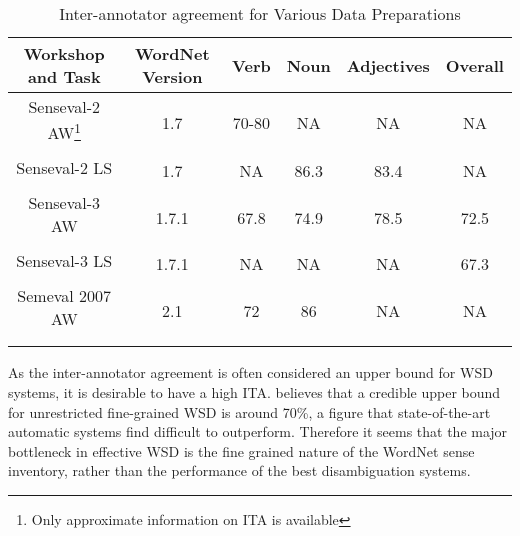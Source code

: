 \begin{center}
\begin{longtable}{| c | c | c | c | c | c |}      
    \hline
Workshop and Task & WordNet Version & Verb & Noun & Adjectives & Overall \\\hline 
Senseval-2 AW\footnote{Only approximate information on ITA is available} & \multirow{2}{*}{1.7} & \multirow{2}{*}{70-80} & \multirow{2}{*}{NA} & \multirow{2}{*}{NA} & \multirow{2}{*}{NA} \\ 
\citep{Senseval2AllWordsTask} & & & & & \\ \hline

Senseval-2 LS & \multirow{2}{*}{1.7} & \multirow{2}{*}{NA} & \multirow{2}{*}{86.3} & \multirow{2}{*}{83.4} & \multirow{2}{*}{NA} \\ 
\citep{Senseval2LexicalSampleTask} & & & & & \\ \hline

Senseval-3 AW  & \multirow{2}{*}{1.7.1} & \multirow{2}{*}{67.8} & \multirow{2}{*}{74.9} & \multirow{2}{*}{78.5} & \multirow{2}{*}{72.5}\\ 
\citep{Senseval3AllWordsTask} & & & & & \\ \hline

Senseval-3 LS & \multirow{2}{*}{1.7.1} & \multirow{2}{*}{NA} & \multirow{2}{*}{NA} & \multirow{2}{*}{NA} & \multirow{2}{*}{67.3}\\ 
\citep{Senseval3LexicalSample} & & & & & \\ \hline

Semeval 2007 AW & \multirow{2}{*}{2.1} & \multirow{2}{*}{72} & \multirow{2}{*}{86} & \multirow{2}{*}{NA} & \multirow{2}{*}{NA} \\ 
\citep{Semeval2007WSD} & & & & & \\ \hline
\caption{Inter-annotator agreement for Various Data Preparations} 
\label{tab:itaWSD}
\end{longtable}
\end{center}

As the inter-annotator agreement is often considered an upper bound for WSD systems, it is desirable to have a high ITA. \citep{Navigli06meaningfulclustering} believes that a credible upper bound for unrestricted fine-grained WSD is around 70\%, a figure that state-of-the-art automatic systems find difficult to outperform. Therefore it seems that the major bottleneck in effective WSD is the fine grained nature of the WordNet sense inventory, rather than the performance of the best disambiguation systems.

